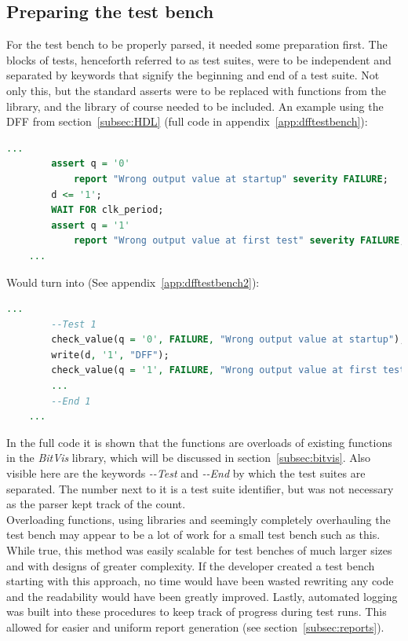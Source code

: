\documentclass[11pt,british]{article}
\begin{document}
\subsection{Preparing the test bench}
\label{subsec:preparing}
For the test bench to be properly parsed, it needed some preparation first. The blocks of tests, henceforth referred to as test suites, were to be independent and separated by keywords that signify the beginning and end of a test suite. Not only this, but the standard asserts were to be replaced with functions from the library, and the library of course needed to be included. An example using the \gls{DFF} from section~\ref{subsec:HDL} (full code in appendix~\ref{app:dfftestbench}):
\begin{lstlisting}[language=VHDL, tabsize=4, frame=single, framesep=2mm, belowskip=8pt, aboveskip=8pt, showstringspaces=false, basicstyle=\footnotesize]
	...
		assert q = '0'
			report "Wrong output value at startup" severity FAILURE;
		d <= '1';
     	WAIT FOR clk_period;
     	assert q = '1'
			report "Wrong output value at first test" severity FAILURE;
	...
\end{lstlisting}
Would turn into (See appendix~\ref{app:dfftestbench2}):
\begin{lstlisting}[language=VHDL, tabsize=4, frame=single, framesep=2mm, belowskip=8pt, aboveskip=8pt, showstringspaces=false, basicstyle=\footnotesize]
	...
		--Test 1
		check_value(q = '0', FAILURE, "Wrong output value at startup");
		write(d, '1', "DFF");
		check_value(q = '1', FAILURE, "Wrong output value at first test");
		...
		--End 1
	...
\end{lstlisting}
In the full code it is shown that the functions are overloads of existing functions in the \emph{BitVis} library, which will be discussed in section~\ref{subsec:bitvis}. Also visible here are the keywords \emph{-\--Test} and \emph{-\--End} by which the test suites are separated. The number next to it is a test suite identifier, but was not necessary as the parser kept track of the count.
\\[\baselineskip]
Overloading functions, using libraries and seemingly completely overhauling the test bench may appear to be a lot of work for a small test bench such as this. While true, this method was easily scalable for test benches of much larger sizes and with designs of greater complexity. If the developer created a test bench starting with this approach, no time would have been wasted rewriting any code and the readability would have been greatly improved. Lastly, automated logging was built into these procedures to keep track of progress during test runs. This allowed for easier and uniform report generation (see section~\ref{subsec:reports}).
\end{document}
